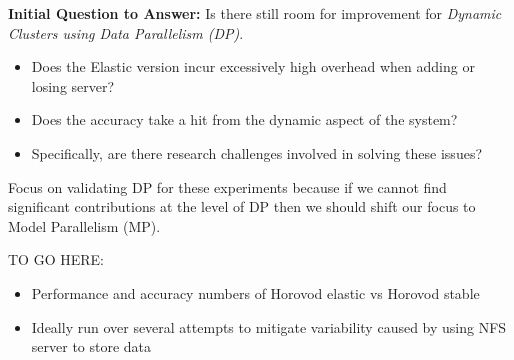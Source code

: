 \vspace{1em}
\textbf{Initial Question to Answer:} Is there still room for improvement for
\emph{Dynamic Clusters using Data Parallelism (DP)}.
\begin{itemize}
    \item Does the Elastic version incur excessively high overhead when
      adding or losing server?
    \item Does the accuracy take a hit from the dynamic aspect of the system?
    \item Specifically, are there research challenges involved in solving these
      issues?
\end{itemize}

\vspace{1em}
Focus on validating DP for these experiments because if we cannot find significant
contributions at the level of DP then we should shift our focus to Model
Parallelism (MP).

\vspace{2em}
TO GO HERE:
\begin{itemize}
    \item Performance and accuracy numbers of Horovod elastic vs Horovod stable
    \item Ideally run over several attempts to mitigate variability caused by
      using NFS server to store data
\end{itemize}
